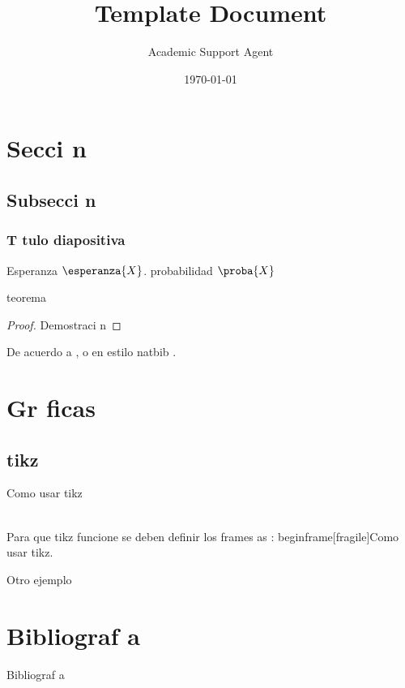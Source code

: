 \documentclass{article}
\title{Template Document}
\author{Academic Support Agent}
\date{\today}
\begin{document}
\maketitle

\begin{frame}
  \titlepage
\end{frame}

\section{Secci n}
\subsection{Subsecci n}
\begin{frame}
  \frametitle{T tulo diapositiva}
  Esperanza $\esperanza{X}$. probabilidad $\proba{X}$ \begin{theorem} teorema
      
  \end{theorem}
  
  \begin{proof} Demostraci n \end{proof}

De acuerdo a \cite{dirac}, o en estilo natbib .
\end{frame}

\section{Gr ficas}
\subsection{tikz}

\begin{frame}[fragile]{Como usar tikz}

\\
Para que tikz funcione se deben definir los frames as : begin{frame}[fragile]{Como usar tikz}.

\end{frame}

\begin{frame}[fragile]{Otro ejemplo}
    \begin{center}
    


\end{center}
\end{frame}

\section{Bibliograf a}
\begin{frame}{Bibliograf a}
\nocite{*}
\printbibliography
\end{frame}
\end{document}
